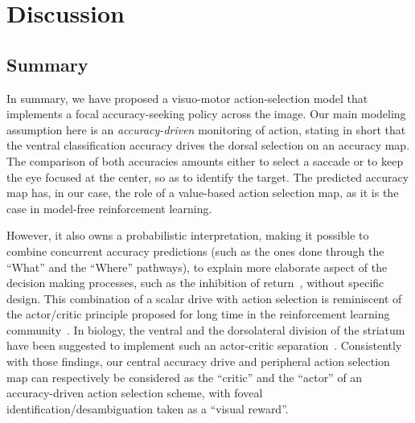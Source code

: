 \section{Discussion} \label{sec:discussion}
\subsection{Summary}

In summary, we have proposed a visuo-motor action-selection model that implements a focal accuracy-seeking policy across the image. Our main modeling assumption here is an \emph{accuracy-driven} monitoring of action, stating in short that the ventral classification accuracy drives the dorsal selection on an accuracy map. The comparison of both accuracies amounts either to select a saccade or to keep the eye focused at the center, so as to identify the target. The predicted accuracy map has, in our case, the role of a value-based action selection map, as it is the case in model-free reinforcement learning.

However, it also owns a probabilistic interpretation, making it possible to combine concurrent accuracy predictions (such as the ones done through the ``What'' and the ``Where''  pathways), to explain more elaborate aspect of the decision making processes, such as the inhibition of return~\cite{Itti01}, without specific design. This combination of a scalar drive with action selection is reminiscent of the actor/critic principle proposed for long time in the reinforcement learning community~\cite{sutton1998reinforcement}. In biology, the ventral and the dorsolateral division of the striatum have been suggested to implement such an actor-critic separation~\cite{joel2002actor, takahashi2008silencing}. Consistently with those findings, our central accuracy drive and peripheral action selection map can respectively be considered as the ``critic'' and the ``actor'' of an accuracy-driven action selection scheme, with foveal identification/desambiguation taken as a ``visual reward''.

